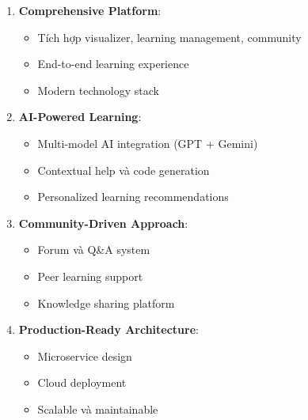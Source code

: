 \begin{enumerate}
    \item \textbf{Comprehensive Platform}:
    \begin{itemize}
        \item Tích hợp visualizer, learning management, community
        \item End-to-end learning experience
        \item Modern technology stack
    \end{itemize}
    
    \item \textbf{AI-Powered Learning}:
    \begin{itemize}
        \item Multi-model AI integration (GPT + Gemini)
        \item Contextual help và code generation
        \item Personalized learning recommendations
    \end{itemize}
    
    \item \textbf{Community-Driven Approach}:
    \begin{itemize}
        \item Forum và Q\&A system
        \item Peer learning support
        \item Knowledge sharing platform
    \end{itemize}
    
    \item \textbf{Production-Ready Architecture}:
    \begin{itemize}
        \item Microservice design
        \item Cloud deployment
        \item Scalable và maintainable
    \end{itemize}
\end{enumerate}
